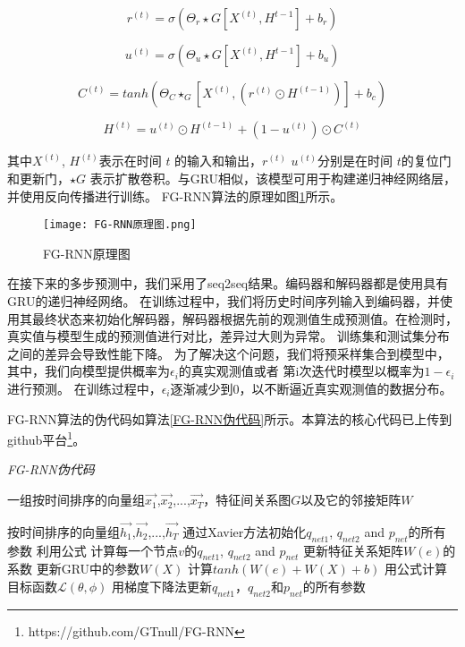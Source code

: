 \begin{equation}
    r^{(t)} = \sigma(\Theta_r\star G[X^{(t)},H^{t-1}] + b_r)
\end{equation}

\begin{equation}
    u^{(t)} = \sigma(\Theta_u\star G[X^{(t)},H^{t-1}] + b_u)
\end{equation}

\begin{equation}
    C^{(t)} = tanh(\Theta_C\star_G[X^{(t)},(r^{(t)}\odot H^{(t-1)})] + b_c)
\end{equation}

\begin{equation}
    H^{(t)} = u^{(t)}\odot H^{(t-1)} + (1 - u^{(t)}) \odot C^{(t)}
\end{equation}

其中$X^{(t)}$, $H^{(t)}$表示在时间 $t$ 的输入和输出，$r^{(t)}$ $u^{(t)}$分别是在时间 $t$的复位门和更新门，$\star G$  表示扩散卷积。与GRU相似，该模型可用于构建递归神经网络层，并使用反向传播进行训练。
FG-RNN算法的原理如图\ref{fig:FG-RNN原理图}所示。
\begin{figure}[H]
  \centering
  \texttt{[image: FG-RNN原理图.png]}
  \caption{FG-RNN原理图}
  \label{fig:FG-RNN原理图}
\end{figure}

在接下来的多步预测中，我们采用了seq2seq结果\cite{sutskever2014sequence}。编码器和解码器都是使用具有GRU的递归神经网络。 在训练过程中，我们将历史时间序列输入到编码器，并使用其最终状态来初始化解码器，解码器根据先前的观测值生成预测值。在检测时，真实值与模型生成的预测值进行对比，差异过大则为异常。 训练集和测试集分布之间的差异会导致性能下降。 为了解决这个问题，我们将预采样\cite{bengio2015scheduled}集合到模型中，其中，我们向模型提供概率为$\epsilon_i$的真实观测值或者 第i次迭代时模型以概率为$1-\epsilon_i$进行预测。 在训练过程中，$\epsilon_i$逐渐减少到0，以不断逼近真实观测值的数据分布。

FG-RNN算法的伪代码如算法\ref{FG-RNN伪代码}所示。本算法的核心代码已上传到github平台\footnote{https://github.com/GTnull/FG-RNN}。
\begin{algorithm}[!h]
  \caption{\emph{FG-RNN伪代码}}
  \label{FG-RNN伪代码}
  \begin{algorithmic}[1]
    \Require
      一组按时间排序的向量组$\vec{x_1}$,$\vec{x_2}$,...,$\vec{x_T}$，特征间关系图$G$以及它的邻接矩阵$W$

    \Ensure
      按时间排序的向量组$\vec{h_1}$,$\vec{h_2}$,...,$\vec{h_T}$
    \State 通过Xavier方法初始化$q_{net1}$, $q_{net2}$ and $p_{net}$的所有参数
        \State 利用公式 计算每一个节点$v$的$q_{net1}$, $q_{net2}$ and $p_{net}$
        \State 更新特征关系矩阵$W(e)$的系数
        \State 更新GRU中的参数$W(X)$
        \State 计算$tanh(W(e) + W(X) + b)$        
        \EndFor
        \State 用公式计算目标函数$\mathcal{L}(\theta, \phi)$ 
        \State 用梯度下降法更新$q_{net1}$，$q_{net2}$和$p_{net}$的所有参数
    \EndWhile
  \end{algorithmic}
\end{algorithm}


